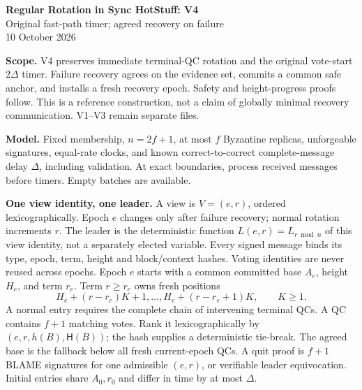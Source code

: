 \documentclass[10pt,a4paper]{article}
\begin{document}
\begin{center}
{\Large\bfseries Regular Rotation in Sync HotStuff: V4}\\[3pt]
{\large Original fast-path timer; agreed recovery on failure}\\[3pt]
10 October 2026
\end{center}

\textbf{Scope.} V4 preserves immediate terminal-QC rotation and the original
vote-start $2\Delta$ timer. Failure recovery agrees on the evidence set,
commits a common safe anchor, and installs a fresh recovery epoch. Safety
and height-progress proofs follow. This is a reference construction, not a
claim of globally minimal recovery communication. V1--V3 remain separate files.

\textbf{Model.} Fixed membership, $n=2f+1$, at most $f$ Byzantine replicas,
unforgeable signatures, equal-rate clocks, and known correct-to-correct
complete-message delay $\Delta$, including validation. At exact boundaries,
process received messages before timers. Empty batches are available.

\textbf{One view identity, one leader.} A view is $V=(e,r)$, ordered
lexicographically. Epoch $e$ changes only after failure recovery; normal
rotation increments $r$. The leader is the deterministic function
$L(e,r)=L_{r\bmod n}$ of this view identity, not a separately elected variable.
Every signed message binds its type, epoch, term, height and block/context
hashes. Voting identities are never reused across epochs.
Epoch $e$ starts with a common committed base $A_e$, height $H_e$, and term
$r_e$. Term $r\ge r_e$ owns fresh positions
\[
 H_e+(r-r_e)K+1,\ldots,H_e+(r-r_e+1)K,\qquad K\ge1.
\]
A normal entry requires the complete chain of intervening terminal QCs.
A QC contains $f+1$ matching votes. Rank it lexicographically by
$(e,r,h(B),\mathsf{H}(B))$; the hash supplies a deterministic tie-break.
The agreed base is the fallback below all fresh current-epoch QCs.
A quit proof is $f+1$ BLAME signatures
for one admissible $(e,r)$, or verifiable leader equivocation. Initial
entries share $A_0,r_0$ and differ in time by at most $\Delta$.
\end{document}
